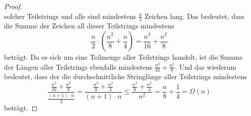 \documentclass[11pt,a4paper]{article}
\begin{document}
\begin{loesung}
\begin{enumerate}
\begin{proof}
\begin{equation*}
            \end{equation*}
            solcher Teilstrings und alle sind mindestens $\frac{n}{2}$ Zeichen lang.
            Das bedeutet, dass die Summe der Zeichen all dieser Teilstrings mindestens
            \begin{equation*}
                \frac{n}{2} \cdot \left( \frac{n^2}{8} + \frac{n}{4} \right) = \frac{n^3}{16} + \frac{n^2}{8}
            \end{equation*}
            beträgt. 
            Da es sich um eine Teilmenge aller Teilstrings handelt, ist die Summe der Längen aller Teilstrings ebenfalls mindestens $\frac{n^3}{16} + \frac{n^2}{8}$.
            Und das wiederum bedeutet, dass der die durchschnittliche Stringlänge aller Teilstrings mindestens 
            \begin{equation*}
                \frac{\frac{n^3}{16} + \frac{n^2}{8}}{\frac{(n + 1) \cdot n}{2} }
                =
                \frac{\frac{n^3}{8} + \frac{n^2}{4}}{(n + 1) \cdot n}
                \leq 
                \frac{\frac{n^3}{8} + \frac{n^2}{4}}{n^2} = \frac{n}{8} + \frac{1}{4} = \Omega(n)
            \end{equation*}
            beträgt.
        \end{proof}


\end{enumerate}
\end{loesung}
\end{document}

